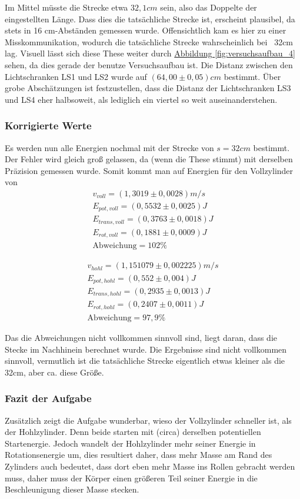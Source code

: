 Im Mittel müsste die Strecke etwa $32,1 cm$ sein, also das Doppelte der eingestellten Länge. Dass dies die tatsächliche Strecke ist, erscheint plausibel, da stets in 16 cm-Abständen gemessen wurde. Offensichtlich kam es hier zu einer Misskommunikation, wodurch die tatsächliche Strecke wahrscheinlich bei ~32cm lag. Visuell lässt sich diese These weiter durch \hyperref[fig:versuchsaufbau_4]{Abbildung \ref*{fig:versuchsaufbau_4}} sehen, da dies gerade der benutze Versuchsaufbau ist. 
Die Distanz zwischen den Lichtschranken LS1 und LS2 wurde auf $(64,00 \pm 0,05)cm$ bestimmt. Über grobe Abschätzungen ist festzustellen, dass die Distanz der Lichtschranken LS3 und LS4 eher halbsoweit, als lediglich ein viertel so weit auseinanderstehen.

\subsubsection*{Korrigierte Werte}
Es werden nun alle Energien nochmal mit der Strecke von $s = 32cm$ bestimmt. Der Fehler wird gleich groß gelassen, da (wenn die These stimmt) mit derselben Präzision gemessen wurde. Somit kommt man auf Energien für den Vollzylinder von
\begin{align}
    v_{voll} = (1,3019 \pm 0,0028) m/s \\
    E_{pot,voll} = (0,5532 \pm 0,0025) J \\
    E_{trans,voll} = (0,3763 \pm 0,0018) J \\
    E_{rot,voll} = (0,1881 \pm 0,0009) J \\
    \text{Abweichung} = 102\%
\end{align}


\begin{align}
    v_{hohl} = (1,151079 \pm 0,002225) m/s \\
    E_{pot,hohl} = (0,552 \pm 0,004) J \\
    E_{trans,hohl} = (0,2935 \pm 0,0013) J \\
    E_{rot,hohl} = (0,2407 \pm 0,0011) J \\
    \text{Abweichung} = 97,9\%
\end{align}

Das die Abweichungen nicht vollkommen sinnvoll sind, liegt daran, dass die Stecke im Nachhinein berechnet wurde. Die Ergebnisse sind nicht vollkommen sinnvoll, vermutlich ist die tatsächliche Strecke eigentlich etwas kleiner als die 32cm, aber ca. diese Größe.

\subsubsection*{Fazit der Aufgabe}
Zusätzlich zeigt die Aufgabe wunderbar, wieso der Vollzylinder schneller ist, als der Hohlzylinder. Denn beide starten mit (circa) derselben potentiellen Startenergie. Jedoch wandelt der Hohlzylinder mehr seiner Energie in Rotationsenergie um, dies resultiert daher, dass mehr Masse am Rand des Zylinders auch bedeutet, dass dort eben mehr Masse ins Rollen gebracht werden muss, daher muss der Körper einen größeren Teil seiner Energie in die Beschleunigung dieser Masse stecken.


